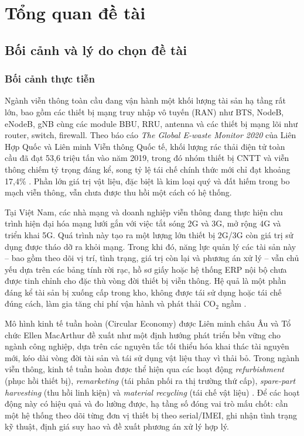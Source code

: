 \chapter{Tổng quan đề tài}
\label{ch:tongquan}

\section{Bối cảnh và lý do chọn đề tài}
\label{sec:boicanh}

\subsection{Bối cảnh thực tiễn}
Ngành viễn thông toàn cầu đang vận hành một khối lượng tài sản hạ tầng rất lớn, bao gồm các thiết bị mạng truy nhập vô tuyến (RAN) như BTS, NodeB, eNodeB, gNB cùng các module BBU, RRU, antenna và các thiết bị mạng lõi như router, switch, firewall. Theo báo cáo \emph{The Global E-waste Monitor 2020} của Liên Hợp Quốc và Liên minh Viễn thông Quốc tế, khối lượng rác thải điện tử toàn cầu đã đạt 53,6 triệu tấn vào năm 2019, trong đó nhóm thiết bị CNTT và viễn thông chiếm tỷ trọng đáng kể, song tỷ lệ tái chế chính thức mới chỉ đạt khoảng 17,4\% \cite{itu2022ewaste}. Phần lớn giá trị vật liệu, đặc biệt là kim loại quý và đất hiếm trong bo mạch viễn thông, vẫn chưa được thu hồi một cách có hệ thống.

Tại Việt Nam, các nhà mạng và doanh nghiệp viễn thông đang thực hiện chu trình hiện đại hóa mạng lưới gắn với việc tắt sóng 2G và 3G, mở rộng 4G và triển khai 5G. Quá trình này tạo ra một lượng lớn thiết bị 2G/3G còn giá trị sử dụng được tháo dỡ ra khỏi mạng. Trong khi đó, năng lực quản lý các tài sản này -- bao gồm theo dõi vị trí, tình trạng, giá trị còn lại và phương án xử lý -- vẫn chủ yếu dựa trên các bảng tính rời rạc, hồ sơ giấy hoặc hệ thống ERP nội bộ chưa được tinh chỉnh cho đặc thù vòng đời thiết bị viễn thông. Hệ quả là một phần đáng kể tài sản bị xuống cấp trong kho, không được tái sử dụng hoặc tái chế đúng cách, làm gia tăng chi phí vận hành và phát thải CO$_2$ ngầm \cite{ghgprotocol2011}.

Mô hình kinh tế tuần hoàn (Circular Economy) được Liên minh châu Âu và Tổ chức Ellen MacArthur \cite{ellenmacarthur2013} đề xuất như một định hướng phát triển bền vững cho ngành công nghiệp, dựa trên các nguyên tắc tối thiểu hóa khai thác tài nguyên mới, kéo dài vòng đời tài sản và tái sử dụng vật liệu thay vì thải bỏ. Trong ngành viễn thông, kinh tế tuần hoàn được thể hiện qua các hoạt động \emph{refurbishment} (phục hồi thiết bị), \emph{remarketing} (tái phân phối ra thị trường thứ cấp), \emph{spare-part harvesting} (thu hồi linh kiện) và \emph{material recycling} (tái chế vật liệu) \cite{geissdoerfer2017}. Để các hoạt động này có hiệu quả và đo lường được, hạ tầng số đóng vai trò mấu chốt: cần một hệ thống theo dõi từng đơn vị thiết bị theo serial/IMEI, ghi nhận tình trạng kỹ thuật, định giá suy hao và đề xuất phương án xử lý hợp lý.

